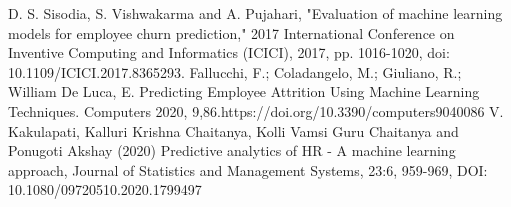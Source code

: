 \documentclass[11pt,conference]{IEEEtran}
\begin{document}
\begin{thebibliography}{00}
 D. S. Sisodia, S. Vishwakarma and A. Pujahari, "Evaluation of machine learning models for employee churn prediction," 2017 International Conference on Inventive Computing and Informatics (ICICI), 2017, pp. 1016-1020, doi: 10.1109/ICICI.2017.8365293.
 Fallucchi, F.; Coladangelo, M.; Giuliano, R.; William De Luca, E. Predicting Employee Attrition Using Machine Learning Techniques. Computers 2020, 9,86.https://doi.org/10.3390/computers9040086
 V. Kakulapati, Kalluri Krishna Chaitanya, Kolli Vamsi Guru Chaitanya and Ponugoti Akshay (2020) Predictive analytics of HR - A machine learning approach, Journal of Statistics and Management Systems, 23:6, 959-969, DOI: 10.1080/09720510.2020.1799497
\end{thebibliography}
\end{document}
